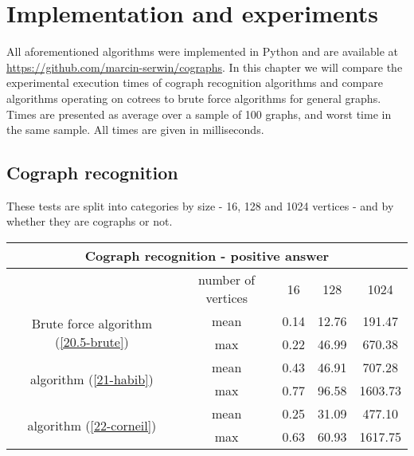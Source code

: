 \chapter{Implementation and experiments}

All aforementioned algorithms were implemented in Python and are available at \url{https://github.com/marcin-serwin/cographs}. In this chapter we will compare the experimental execution times of cograph recognition algorithms and compare algorithms operating on cotrees to brute force algorithms for general graphs. Times are presented as average over a sample of 100 graphs, and worst time in the same sample. All times are given in milliseconds.

\section{Cograph recognition}
These tests are split into categories by size - 16, 128 and 1024 vertices - and by whether they are cographs or not.

\begin{center}

    \begin{tabular}{ |c|c|c|c|c|}
        \hline
        \multicolumn{5}{|c|}{Cograph recognition - positive answer}                                                 \\
        \hline
                                                                      & number of vertices & 16   & 128   & 1024    \\
        \hline
        \multirow{2}{*}{Brute force algorithm (\ref{20.5-brute})}     & mean               & 0.14 & 12.76 & 191.47  \\
                                                                      & max                & 0.22 & 46.99 & 670.38  \\
        \hline
        \multirow{2}{*}{\cite{habib} algorithm (\ref{21-habib})}      & mean               & 0.43 & 46.91 & 707.28  \\
                                                                      & max                & 0.77 & 96.58 & 1603.73 \\
        \hline
        \multirow{2}{*}{\cite{corneil} algorithm (\ref{22-corneil}) } & mean               & 0.25 & 31.09 & 477.10  \\
                                                                      & max                & 0.63 & 60.93 & 1617.75 \\
        \hline
    \end{tabular}
\end{center}

